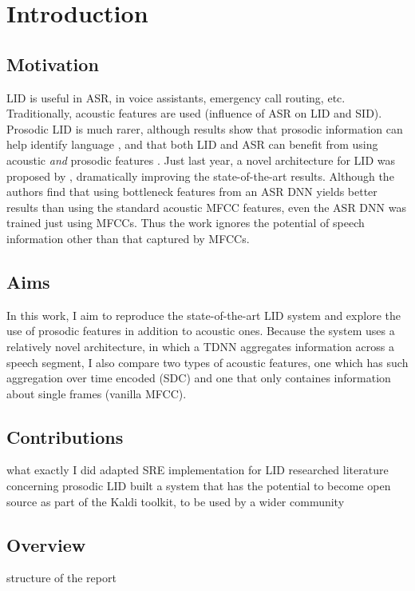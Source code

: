 \documentclass[bsc,frontabs,twoside,singlespacing,parskip,deptreport]{infthesis}
\begin{document}
\chapter{Introduction}{
  \section{Motivation}{
    LID is useful in ASR, in voice assistants, emergency call routing, etc.
    Traditionally, acoustic features are used (influence of ASR on LID and SID). Prosodic LID is much rarer, although results show that prosodic information can help identify language \citep{Lin_et_al_2005}, and that both LID and ASR can benefit from using acoustic \textit{and} prosodic features \citep{Martinez_et_al_2013,Ghahremani_et_al_2014}.
    Just last year, a novel architecture for LID was proposed by \cite{Snyder_et_al_2018}, dramatically improving the state-of-the-art results. Although the authors find that using bottleneck features from an ASR DNN yields better results than using the standard acoustic MFCC features, even the ASR DNN was trained just using MFCCs. Thus the work ignores the potential of speech information other than that captured by MFCCs.
  }
  \section{Aims}{
    In this work, I aim to reproduce the state-of-the-art LID system and explore the use of prosodic features in addition to acoustic ones. Because the system uses a relatively novel architecture, in which a TDNN aggregates information across a speech segment, I also compare two types of acoustic features, one which has such aggregation over time encoded (SDC) and one that only containes information about single frames (vanilla MFCC).
  }
  \section{Contributions}{
    what exactly I did
    adapted SRE implementation for LID
    researched literature concerning prosodic LID
    built a system that has the potential to become open source as part of the Kaldi toolkit, to be used by a wider community
  }
  \section{Overview}{
    structure of the report
  }
}
\end{document}
